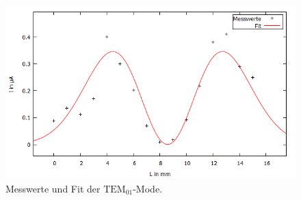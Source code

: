 \begin{figure}[H]
  \centering
  \includegraphics[width=14cm]{bilder/erstemodefit.png}
  \caption{Messwerte und Fit der  $\text{TEM}_{01}$-Mode.}
  \label{mode1fit}
\end{figure}
